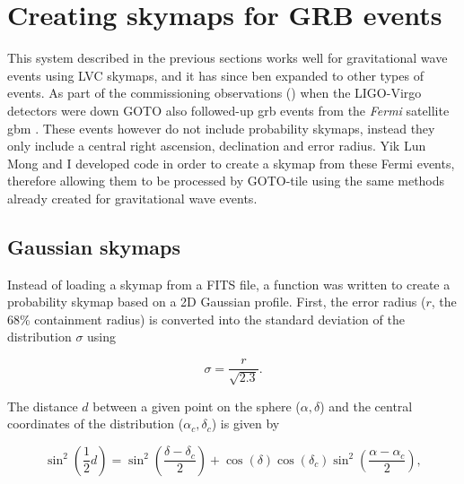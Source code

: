 \section{Creating skymaps for GRB events}
\label{sec:grb_skymaps}
\begin{colsection}


\begin{colsection}


This system described in the previous sections works well for gravitational wave events using LVC skymaps, and it has since ben expanded to other types of events. As part of the commissioning observations () when the LIGO-Virgo detectors were down GOTO also followed-up \gls{grb} events from the \textit{Fermi} satellite \gls{gbm} \citep{Fermi_GBM}. These events however do not include probability skymaps, instead they only include a central right ascension, declination and error radius. Yik Lun Mong and I developed code in order to create a skymap from these Fermi events, therefore allowing them to be processed by GOTO-tile using the same methods already created for gravitational wave events.

\end{colsection}


\subsection{Gaussian skymaps}
\label{sec:gaussian_skymaps}
\begin{colsection}

Instead of loading a skymap from a FITS file, a function was written to create a probability skymap based on a 2D Gaussian profile. First, the error radius ($r$, the 68\% containment radius) is converted into the standard deviation of the distribution $\sigma$ using

\begin{equation}
    \sigma = \frac{r}{\sqrt{2.3}}.
    \label{eq:gaussian_sigma}
\end{equation}

The distance $d$ between a given point on the sphere ($\alpha, \delta$) and the central coordinates of the distribution ($\alpha_c, \delta_c$) is given by

\begin{equation}
    \sin^2 \left ( \frac{1}{2} d \right )
    = \sin^2 \left ( \frac{\delta-\delta_c}{2} \right)
      + \cos (\delta) \cos (\delta_c) \sin^2 \left ( \frac{\alpha-\alpha_c}{2} \right),
    \label{eq:gaussian_distance}
\end{equation}


\end{colsection}
\end{colsection}
